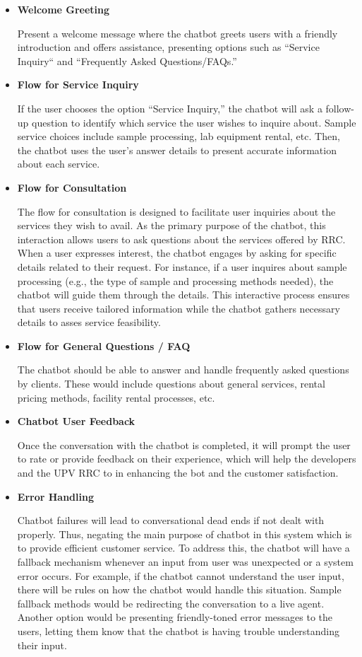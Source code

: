 \begin{itemize}
	\item \textbf{Welcome Greeting}
	
	Present a welcome message where the chatbot greets users with a friendly introduction and offers assistance, presenting options such as “Service Inquiry“ and “Frequently Asked Questions/FAQs.” 
	
	\item \textbf{Flow for Service Inquiry}
	
	If the user chooses the option “Service Inquiry,” the chatbot will ask a follow-up question to identify which service the user wishes to inquire about. Sample service choices include sample processing,  lab equipment rental, etc. Then, the chatbot uses the user's answer details to present accurate information about each service.
	
	\item \textbf{Flow for Consultation}
	
	The flow for consultation is designed to facilitate user inquiries about the services they wish to avail. As the primary purpose of the chatbot, this interaction allows users to ask questions about the services offered by RRC. When a user expresses interest, the chatbot engages by asking for specific details related to their request. For instance, if a user inquires about sample processing (e.g., the type of sample and processing methods needed), the chatbot will guide them through the details. This interactive process ensures that users receive tailored information while the chatbot gathers necessary details to asses service feasibility.
	
	\item \textbf{Flow for General Questions / FAQ}
	
	The chatbot should be able to answer and handle frequently asked questions by clients. These would include questions about general services, rental pricing methods, facility rental processes, etc.
	
	\item \textbf{Chatbot User Feedback}
	
	Once the conversation with the chatbot is completed, it will prompt the user to rate or provide feedback on their experience, which will help the developers and the UPV RRC to in enhancing the bot and the customer satisfaction.
	
	\item \textbf{Error Handling}
	
	Chatbot failures will lead to conversational dead ends if not dealt with properly. Thus, negating the main purpose of chatbot in this system which is to provide efficient customer service. To address this, the chatbot will have a fallback mechanism whenever an input from user was unexpected or a system error occurs. For example, if the chatbot cannot understand the user input, there will be rules on how the chatbot would handle this situation. Sample fallback methods would be redirecting the conversation to a live agent. Another option would be presenting friendly-toned error messages to the users, letting them know that the chatbot is having trouble understanding their input.
	

\end{itemize}
